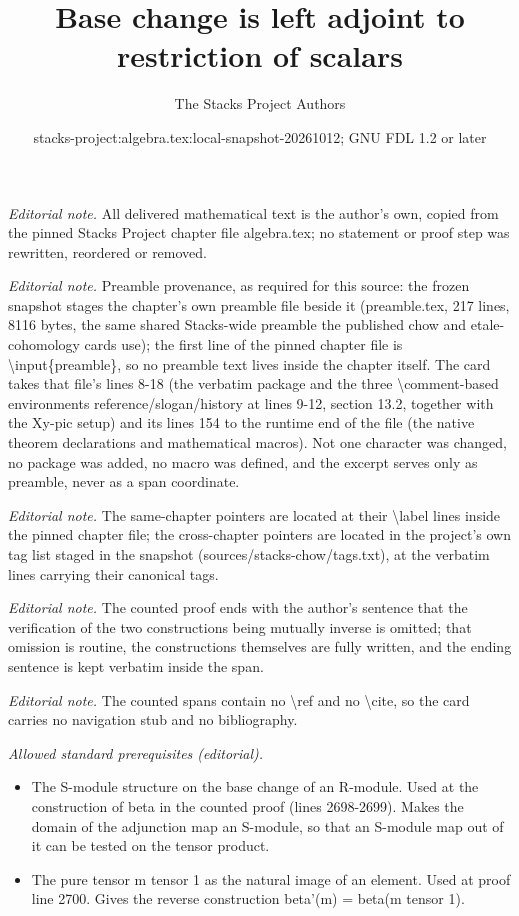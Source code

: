\documentclass[10pt,a4paper]{amsart}
\title{Base change is left adjoint to restriction of scalars}
\author{The Stacks Project Authors}
\date{stacks-project:algebra.tex:local-snapshot-20261012; GNU FDL 1.2 or later}
\theoremstyle{plain}
\theoremstyle{definition}
\theoremstyle{remark}
\numberwithin{equation}{subsection}
\begin{document}
\maketitle
\noindent\textit{Editorial note.} All delivered mathematical text is the author's own, copied from the pinned Stacks Project chapter file algebra.tex; no statement or proof step was rewritten, reordered or removed.\par\medskip
\noindent\textit{Editorial note.} Preamble provenance, as required for this source: the frozen snapshot stages the chapter's own preamble file beside it (preamble.tex, 217 lines, 8116 bytes, the same shared Stacks-wide preamble the published chow and etale-cohomology cards use); the first line of the pinned chapter file is \textbackslash{}input\{preamble\}, so no preamble text lives inside the chapter itself. The card takes that file's lines 8-18 (the verbatim package and the three \textbackslash{}comment-based environments reference/slogan/history at lines 9-12, section 13.2, together with the Xy-pic setup) and its lines 154 to the runtime end of the file (the native theorem declarations and mathematical macros). Not one character was changed, no package was added, no macro was defined, and the excerpt serves only as preamble, never as a span coordinate.\par\medskip
\noindent\textit{Editorial note.} The same-chapter pointers are located at their \textbackslash{}label lines inside the pinned chapter file; the cross-chapter pointers are located in the project's own tag list staged in the snapshot (sources/stacks-chow/tags.txt), at the verbatim lines carrying their canonical tags.\par\medskip
\noindent\textit{Editorial note.} The counted proof ends with the author's sentence that the verification of the two constructions being mutually inverse is omitted; that omission is routine, the constructions themselves are fully written, and the ending sentence is kept verbatim inside the span.\par\medskip
\noindent\textit{Editorial note.} The counted spans contain no \textbackslash{}ref and no \textbackslash{}cite, so the card carries no navigation stub and no bibliography.\par\medskip
\noindent\textit{Allowed standard prerequisites (editorial).}\begin{itemize}
\item The S-module structure on the base change of an R-module. Used at the construction of beta in the counted proof (lines 2698-2699). Makes the domain of the adjunction map an S-module, so that an S-module map out of it can be tested on the tensor product.
\item The pure tensor m tensor 1 as the natural image of an element. Used at proof line 2700. Gives the reverse construction beta'(m) = beta(m tensor 1).
\end{itemize}\medskip
\end{document}

